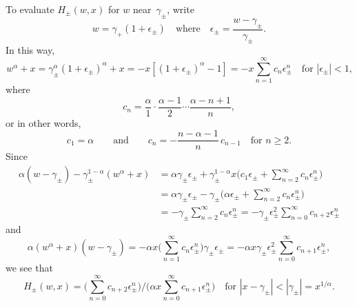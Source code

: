 \documentclass[12pt,a4paper]{article}
\begin{document}
To evaluate $H_\pm(w,x)$ for $w$ near~$\gamma_\pm$, write
\[
w=\gamma_+(1+\epsilon_\pm)\quad\text{where}\quad
\epsilon_\pm=\frac{w-\gamma_\pm}{\gamma_\pm}.
\]
In this way,
\[
w^\alpha+x=\gamma_\pm^\alpha(1+\epsilon_\pm)^\alpha+x
    =-x[(1+\epsilon_\pm)^\alpha-1 ]
    =-x\sum_{n=1}^\infty c_n\epsilon_\pm^n\quad\text{for $|\epsilon_\pm|<1$,}
\]
where
\[
c_n=\frac{\alpha}{1}\cdot\frac{\alpha-1}{2}\cdots\frac{\alpha-n+1}{n},
\]
or in other words,
\[
c_1=\alpha\qquad\text{and}\qquad c_n=-\frac{n-\alpha-1}{n}\,c_{n-1}
\quad\text{for $n\ge2$.}
\]
Since
\begin{align*}
\alpha(w-\gamma_\pm)-\gamma_\pm^{1-\alpha}(w^\alpha+x)
    &=\alpha\gamma_\pm\epsilon_\pm+\gamma_\pm^{1-\alpha}x
        \biggl(c_1\epsilon_\pm+\sum_{n=2}^\infty c_n\epsilon_\pm^n\biggr)\\
    &=\alpha\gamma_\pm\epsilon_\pm-\gamma_\pm
        \biggl(\alpha\epsilon_\pm+\sum_{n=2}^\infty c_n\epsilon_\pm^n\biggr)\\
    &=-\gamma_\pm\sum_{n=2}^\infty c_n\epsilon_\pm^n
    =-\gamma_\pm\epsilon_\pm^2\sum_{n=0}^\infty c_{n+2}\epsilon_\pm^n
\end{align*}
and
\[
\alpha(w^\alpha+x)(w-\gamma_\pm)=-\alpha x\biggl(\sum_{n=1}^\infty 
    c_n\epsilon_\pm^n\biggr)\gamma_\pm\epsilon_\pm
    =-\alpha x\gamma_\pm\epsilon_\pm^2\sum_{n=0}^\infty c_{n+1}\epsilon_\pm^n,
\]
we see that
\[
H_\pm(w,x)=\biggl(\sum_{n=0}^\infty c_{n+2}\epsilon_\pm^n\biggr)\bigg/
    \biggl(\alpha x\sum_{n=0}^\infty c_{n+1}\epsilon_\pm^n\biggr)
    \quad\text{for $|x-\gamma_\pm|<|\gamma_\pm|=x^{1/\alpha}$.}
\]
\end{document}
